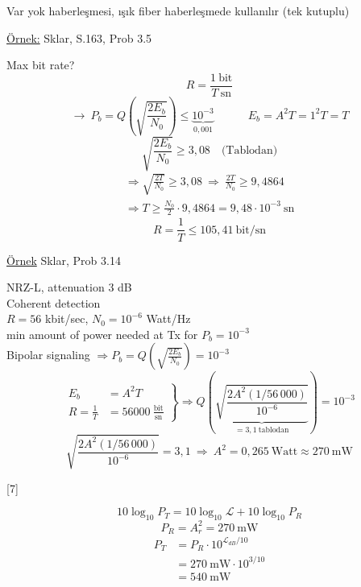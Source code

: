 \documentclass[11pt,a4paper]{article}
\begin{document}
\noindent Var yok haberleşmesi, ışık fiber haberleşmede kullanılır (tek kutuplu)

\noindent \underline{Örnek:} Sklar, S.163, Prob 3.5

\noindent Max bit rate?
\[ R = \frac{1\ \text{bit}}{T\ \text{sn}} \]
\[ \rightarrow\ P_b = Q\!\left(\sqrt{\frac{2E_b}{N_0}}\right) \le \underbrace{10^{-3}}_{0{,}001} \qquad\quad E_b = A^2T = 1^2T = T \]
\[ \sqrt{\frac{2E_b}{N_0}} \ge 3{,}08 \quad \text{(Tablodan)} \]
\begin{gather*}
\Rightarrow \sqrt{\frac{2T}{N_0}} \ge 3{,}08 \ \Rightarrow\ \frac{2T}{N_0} \ge 9{,}4864\\
\Rightarrow T \ge \frac{N_0}{2}\cdot 9{,}4864 = 9{,}48\cdot10^{-3}\ \text{sn}
\end{gather*}
\[ R = \frac{1}{T} \le 105{,}41\ \text{bit/sn} \]

\noindent \underline{Örnek} Sklar, Prob 3.14

\noindent NRZ-L, attenuation 3 dB\\
Coherent detection\\
$R=56$ kbit/sec, $N_0=10^{-6}$ Watt/Hz\\
min amount of power needed at Tx for $P_b=10^{-3}$\\
Bipolar signaling $\Rightarrow P_b = Q\!\left(\sqrt{\frac{2E_b}{N_0}}\right) = 10^{-3}$
\[
\left.\begin{aligned}
E_b &= A^2T\\
R = \frac{1}{T} &= 56000\ \tfrac{\text{bit}}{\text{sn}}
\end{aligned}\right\}
\Rightarrow Q\!\left(\underbrace{\sqrt{\frac{2A^2(1/56\,000)}{10^{-6}}}}_{=3{,}1\ \text{tablodan}}\right) = 10^{-3}
\]
\[ \sqrt{\frac{2A^2(1/56\,000)}{10^{-6}}} = 3{,}1 \ \Rightarrow\ A^2 = 0{,}265\ \text{Watt} \approx 270\ \text{mW} \]

[7]

\[ 10\log_{10}P_T = 10\log_{10}\mathcal{L} + 10\log_{10}P_R \]
\[ P_R = A_r^2 = 270\ \mathrm{mW} \]
\begin{align*}
P_T &= P_R\cdot 10^{\mathcal{L}_{dB}/10}\\
&= 270\ \mathrm{mW}\cdot 10^{3/10}\\
&= 540\ \mathrm{mW}
\end{align*}
\end{document}
